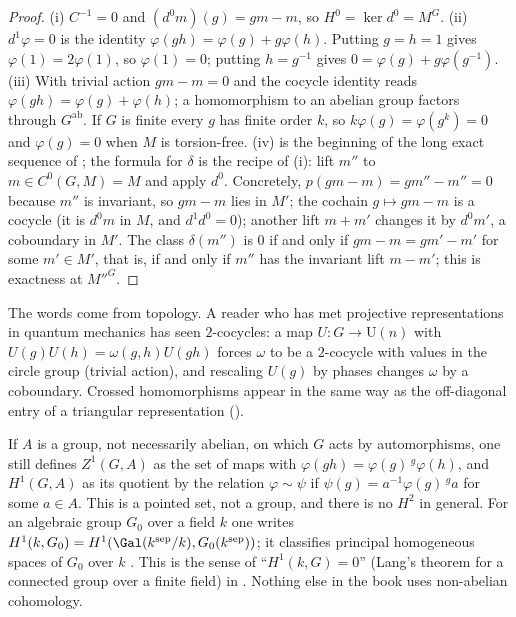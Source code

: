 \begin{proof}
(i) $C^{-1}=0$ and $(d^0m)(g)=gm-m$, so $H^0=\ker d^0=M^G$. (ii) $d^1\varphi=0$ is the identity $\varphi(gh)=\varphi(g)+g\varphi(h)$. Putting $g=h=1$ gives
$\varphi(1)=2\varphi(1)$, so $\varphi(1)=0$; putting $h=g^{-1}$ gives $0=\varphi(g)+g\varphi(g^{-1})$. (iii) With trivial action $gm-m=0$ and the cocycle
identity reads $\varphi(gh)=\varphi(g)+\varphi(h)$; a homomorphism to an abelian group factors through $G^{\mathrm{ab}}$. If $G$ is finite every $g$ has finite
order $k$, so $k\varphi(g)=\varphi(g^k)=0$ and $\varphi(g)=0$ when $M$ is torsion-free. (iv) is the beginning of the long exact sequence of
; the formula for $\delta$ is the recipe of (i): lift $m''$ to $m\in C^0(G,M)=M$ and apply $d^0$.
Concretely, $p(gm-m)=gm''-m''=0$ because $m''$ is invariant, so $gm-m$ lies in $M'$; the cochain $g\mapsto gm-m$ is a cocycle (it is $d^0m$ in $M$, and $d^1d^0=0$);
another lift $m+m'$ changes it by $d^0m'$, a coboundary in $M'$. The class $\delta(m'')$ is $0$ if and only if $gm-m=gm'-m'$ for some $m'\in M'$, that is, if and only if
$m''$ has the invariant lift $m-m'$; this is exactness at $M''^G$.
\end{proof}

\begin{remark}\label{rem:cohomology:cocycle-words}
The words come from topology. A reader who has met projective representations in quantum mechanics has seen $2$-cocycles: a map
$U\colon G\to\mathrm U(n)$ with $U(g)U(h)=\omega(g,h)U(gh)$ forces $\omega$ to be a $2$-cocycle with values in the circle group (trivial action), and rescaling
$U(g)$ by phases changes $\omega$ by a coboundary. Crossed homomorphisms appear in the same way as the off-diagonal entry of a triangular representation
().
\end{remark}

\begin{remark}\label{rem:cohomology:nonabelian}
If $A$ is a group, not necessarily abelian, on which $G$ acts by automorphisms, one still defines $Z^1(G,A)$ as the set of maps with
$\varphi(gh)=\varphi(g)\,{}^g\varphi(h)$, and $H^1(G,A)$ as its quotient by the relation $\varphi\sim\psi$ if $\psi(g)=a^{-1}\varphi(g)\,{}^ga$ for some $a\in A$. This is a
pointed set, not a group, and there is no $H^2$ in general. For an algebraic group $G_0$ over a field $k$ one writes $H^1(k,G_0)=H^1(\Gal(k^{\mathrm{sep}}/k),G_0(k^{\mathrm{sep}}))$;
it classifies principal homogeneous spaces of $G_0$ over $k$ \cite[Chapter I, Section 5 and Chapter III]{SerreGaloisCoh}. This is the sense of
``$H^1(k,G)=0$'' (Lang's theorem for a connected group over a finite field) in . Nothing else in the book uses non-abelian cohomology.
\end{remark}


